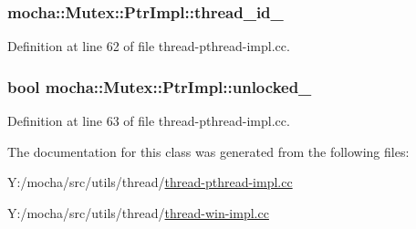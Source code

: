 \hypertarget{classmocha_1_1_mutex_1_1_ptr_impl_a40123271470e3e66cf3e55e40f27f685}{
\subsubsection[{thread\_\-id\_\-}]{ {\bf mocha::Mutex::PtrImpl::thread\_\-id\_\-}}}
\label{classmocha_1_1_mutex_1_1_ptr_impl_a40123271470e3e66cf3e55e40f27f685}


Definition at line 62 of file thread-\/pthread-\/impl.cc.

\hypertarget{classmocha_1_1_mutex_1_1_ptr_impl_aad4220d1849efd1a2b31a67f959bfe02}{
\subsubsection[{unlocked\_\-}]{\setlength{\rightskip}{0pt plus 5cm}bool {\bf mocha::Mutex::PtrImpl::unlocked\_\-}}}
\label{classmocha_1_1_mutex_1_1_ptr_impl_aad4220d1849efd1a2b31a67f959bfe02}


Definition at line 63 of file thread-\/pthread-\/impl.cc.



The documentation for this class was generated from the following files:\begin{DoxyCompactItemize}
\item 
Y:/mocha/src/utils/thread/\hyperlink{thread-pthread-impl_8cc}{thread-\/pthread-\/impl.cc}\item 
Y:/mocha/src/utils/thread/\hyperlink{thread-win-impl_8cc}{thread-\/win-\/impl.cc}\end{DoxyCompactItemize}
